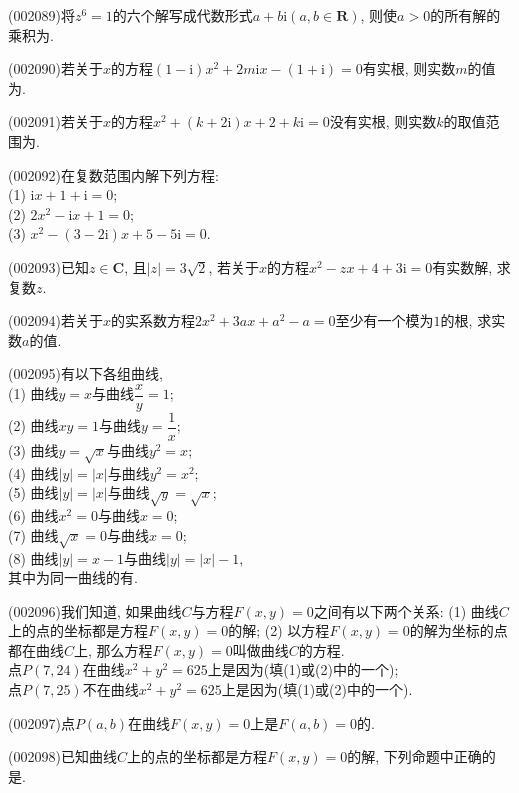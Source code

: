 \item (002089)将$z^6=1$的六个解写成代数形式$a+b\mathrm{i}(a,b\in \mathbf{R})$, 则使$a>0$的所有解的乘积为.
\item (002090)若关于$x$的方程$(1-\mathrm{i})x^2+2m\mathrm{i} x-(1+\mathrm{i})=0$有实根, 则实数$m$的值为.
\item (002091)若关于$x$的方程$x^2+(k+2\mathrm{i})x+2+k\mathrm{i}=0$没有实根, 则实数$k$的取值范围为.
\item (002092)在复数范围内解下列方程:\\ 
(1) $\mathrm{i} x+1+\mathrm{i}=0$;\\ 
(2) $2x^2-\mathrm{i} x+1=0$;\\ 
(3) $x^2-(3-2\mathrm{i})x+5-5\mathrm{i}=0$.
\item (002093)已知$z\in\mathbf{C}$, 且$|z|=3\sqrt{2}$, 若关于$x$的方程$x^2-zx+4+3\mathrm{i}=0$有实数解, 求复数$z$.
\item (002094)若关于$x$的实系数方程$2x^2+3ax+a^2-a=0$至少有一个模为$1$的根, 求实数$a$的值.
\item (002095)有以下各组曲线,\\ 
(1) 曲线$y=x$与曲线$\dfrac{x}{y}=1$;\\ 
(2) 曲线$xy=1$与曲线$y=\dfrac{1}{x}$;\\ 
(3) 曲线$y=\sqrt{x}$与曲线$y^2=x$;\\ 
(4) 曲线$|y|=|x|$与曲线$y^2=x^2$;\\ 
(5) 曲线$|y|=|x|$与曲线$\sqrt{y}=\sqrt{x}$;\\ 
(6) 曲线$x^2=0$与曲线$x=0$;\\ 
(7) 曲线$\sqrt{x}=0$与曲线$x=0$;\\ 
(8) 曲线$|y|=x-1$与曲线$|y|=|x|-1$,\\ 
其中为同一曲线的有.
\item (002096)我们知道, 如果曲线$C$与方程$F(x,y)=0$之间有以下两个关系:
(1) 曲线$C$上的点的坐标都是方程$F(x,y)=0$的解;
(2) 以方程$F(x,y)=0$的解为坐标的点都在曲线$C$上,
那么方程$F(x,y)=0$叫做曲线$C$的方程.\\ 
点$P(7,24)$在曲线$x^2+y^2=625$上是因为(填(1)或(2)中的一个);\\ 
点$P(7,25)$不在曲线$x^2+y^2=625$上是因为(填(1)或(2)中的一个).
\item (002097)点$P(a,b)$在曲线$F(x,y)=0$上是$F(a,b)=0$的.
\item (002098)已知曲线$C$上的点的坐标都是方程$F(x,y)=0$的解, 下列命题中正确的是.
